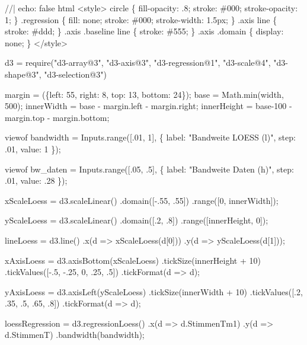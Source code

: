 \documentclass[
  letterpaper,
  DIV=11,
  oneside]{scrreprt}
\newenvironment{Shaded}{\begin{snugshade}}{\end{snugshade}}
\newcommand{\NormalTok}[1]{\textcolor[rgb]{0.00,0.23,0.31}{#1}}
\begin{document}
\begin{Shaded}
\begin{Highlighting}[]
\NormalTok{//| echo: false}
\NormalTok{html\textasciigrave{}}
\NormalTok{\textless{}style\textgreater{}}
\NormalTok{circle \{}
\NormalTok{  fill{-}opacity: .8;}
\NormalTok{  stroke: \#000;}
\NormalTok{  stroke{-}opacity: 1;}
\NormalTok{\}}
\NormalTok{.regression \{}
\NormalTok{  fill: none;}
\NormalTok{  stroke: \#000;}
\NormalTok{  stroke{-}width: 1.5px;}
\NormalTok{\}}
\NormalTok{.axis line \{}
\NormalTok{  stroke: \#ddd;}
\NormalTok{\}}
\NormalTok{.axis .baseline line \{}
\NormalTok{  stroke: \#555;}
\NormalTok{\}}
\NormalTok{.axis .domain \{}
\NormalTok{  display: none;}
\NormalTok{\} }
\NormalTok{\textless{}/style\textgreater{}}
\NormalTok{\textasciigrave{}}

\NormalTok{d3 = require("d3{-}array@3", "d3{-}axis@3", "d3{-}regression@1", "d3{-}scale@4", "d3{-}shape@3", "d3{-}selection@3")}

\NormalTok{margin = (\{left: 55, right: 8, top: 13, bottom: 24\});}
\NormalTok{base = Math.min(width, 500);}
\NormalTok{innerWidth = base {-} margin.left {-} margin.right;}
\NormalTok{innerHeight = base{-}100 {-} margin.top {-} margin.bottom;}

\NormalTok{viewof bandwidth = Inputs.range([.01, 1], \{}
\NormalTok{  label: "Bandweite LOESS (l)",}
\NormalTok{  step: .01,}
\NormalTok{  value: 1}
\NormalTok{\});}

\NormalTok{viewof bw\_daten = Inputs.range([.05, .5], \{}
\NormalTok{  label: "Bandweite Daten (h)",}
\NormalTok{  step: .01,}
\NormalTok{  value: .28}
\NormalTok{\});}

\NormalTok{xScaleLoess = d3.scaleLinear()}
\NormalTok{   .domain([{-}.55, .55])}
\NormalTok{   .range([0, innerWidth]);}
   
\NormalTok{yScaleLoess = d3.scaleLinear()}
\NormalTok{  .domain([.2, .8])}
\NormalTok{  .range([innerHeight, 0]);}

\NormalTok{lineLoess = d3.line()}
\NormalTok{  .x(d =\textgreater{} xScaleLoess(d[0]))}
\NormalTok{  .y(d =\textgreater{} yScaleLoess(d[1]));}
  
\NormalTok{xAxisLoess = d3.axisBottom(xScaleLoess)}
\NormalTok{  .tickSize(innerHeight + 10)}
\NormalTok{  .tickValues([{-}.5, {-}.25, 0, .25, .5])}
\NormalTok{  .tickFormat(d =\textgreater{} d);}

\NormalTok{yAxisLoess = d3.axisLeft(yScaleLoess)}
\NormalTok{  .tickSize(innerWidth + 10)}
\NormalTok{  .tickValues([.2, .35, .5, .65, .8])}
\NormalTok{  .tickFormat(d =\textgreater{} d);}

\NormalTok{loessRegression = d3.regressionLoess()}
\NormalTok{  .x(d =\textgreater{} d.StimmenTm1)}
\NormalTok{  .y(d =\textgreater{} d.StimmenT)}
\NormalTok{  .bandwidth(bandwidth);}
\end{Highlighting}
\end{Shaded}
\end{document}
